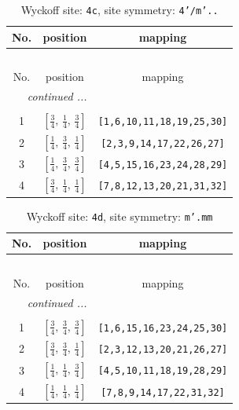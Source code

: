 \documentclass[fleqn,8pt]{jsarticle}
\begin{document}
\renewcommand{\arraystretch}{1.2}
\begin{longtable}{ccc}
\caption{Wyckoff site: {\tt 4c}, site symmetry: {\tt 4'/m'..}}
 \\
 \hline \hline
No. & position & mapping \\ \hline \endfirsthead

\multicolumn{2}{l}{\tablename\ \thetable{}} \\
 \hline \hline
No. & position & mapping \\ \hline \endhead

 \hline \hline
\multicolumn{2}{r}{\footnotesize\it continued ...} \\ \endfoot

 \hline \hline
\multicolumn{2}{r}{} \\ \endlastfoot

1 & $\left[ \frac{3}{4},\, \frac{1}{4},\, \frac{3}{4} \right]$ & {\tt [1,6,10,11,18,19,25,30]} \\ \hline
2 & $\left[ \frac{1}{4},\, \frac{3}{4},\, \frac{1}{4} \right]$ & {\tt [2,3,9,14,17,22,26,27]} \\ \hline
3 & $\left[ \frac{1}{4},\, \frac{3}{4},\, \frac{3}{4} \right]$ & {\tt [4,5,15,16,23,24,28,29]} \\ \hline
4 & $\left[ \frac{3}{4},\, \frac{1}{4},\, \frac{1}{4} \right]$ & {\tt [7,8,12,13,20,21,31,32]} \\
\end{longtable}
\renewcommand{\arraystretch}{1.2}
\begin{longtable}{ccc}
\caption{Wyckoff site: {\tt 4d}, site symmetry: {\tt m'.mm}}
 \\
 \hline \hline
No. & position & mapping \\ \hline \endfirsthead

\multicolumn{2}{l}{\tablename\ \thetable{}} \\
 \hline \hline
No. & position & mapping \\ \hline \endhead

 \hline \hline
\multicolumn{2}{r}{\footnotesize\it continued ...} \\ \endfoot

 \hline \hline
\multicolumn{2}{r}{} \\ \endlastfoot

1 & $\left[ \frac{3}{4},\, \frac{3}{4},\, \frac{3}{4} \right]$ & {\tt [1,6,15,16,23,24,25,30]} \\ \hline
2 & $\left[ \frac{3}{4},\, \frac{3}{4},\, \frac{1}{4} \right]$ & {\tt [2,3,12,13,20,21,26,27]} \\ \hline
3 & $\left[ \frac{1}{4},\, \frac{1}{4},\, \frac{3}{4} \right]$ & {\tt [4,5,10,11,18,19,28,29]} \\ \hline
4 & $\left[ \frac{1}{4},\, \frac{1}{4},\, \frac{1}{4} \right]$ & {\tt [7,8,9,14,17,22,31,32]} \\
\end{longtable}
\end{document}
